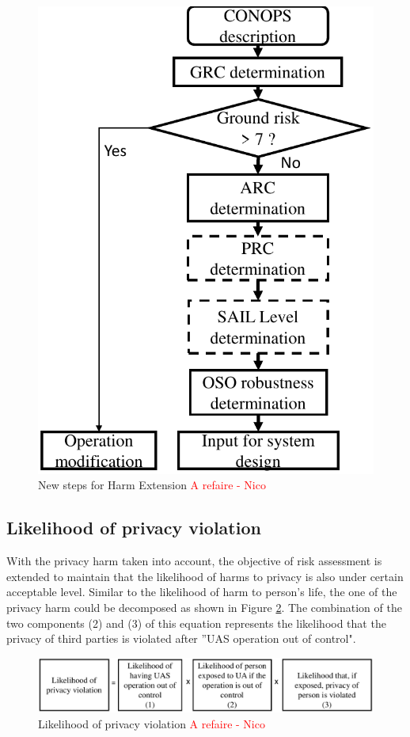 \documentclass[a4paper, 10, conference]{ieeeconf}  %
\begin{document}
  \begin{figure}[!ht]
   	\centering
   	\includegraphics[width= 2.9 in]{image/Extended_Processs_in_module1.pdf}
   	\caption{New steps for Harm Extension \textcolor{red}{A refaire - Nico}}
   	\label{figure: New steps Ex1}
   \end{figure}  
   
\subsection {Likelihood of privacy violation}
With the privacy harm taken into account, the objective of risk assessment is extended to maintain that the likelihood of harms to privacy is also under certain acceptable level. Similar to the likelihood of harm to person's life, the one of the privacy harm could be decomposed as shown in Figure \ref{figure: new ham likelihood}. The combination of the two components (2) and (3) of this equation represents the likelihood that the privacy of third parties is violated after ''UAS operation out of control". 

\begin{figure}[!ht]
	\centering
	\includegraphics[width=3.3 in]{image/likelihood_of_privacy_violation.pdf}
	\caption{Likelihood of privacy violation \textcolor{red}{A refaire - Nico}}
	\label{figure: new ham likelihood}
\end{figure}
\end{document}
